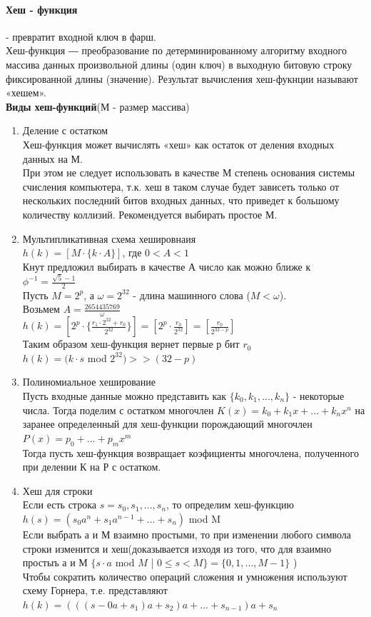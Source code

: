 \documentclass[a4paper,10pt]{article}
\begin{document}
\paragraph{Хеш - функция} - превратит входной ключ в фарш.\\
Хеш-функция ― преобразование по детерминированному алгоритму входного массива данных произвольной длины (один ключ) в выходную битовую строку фиксированной длины (значение). Результат вычисления хеш-фукнции называют «хешем».\\
\textbf{Виды хеш-функций}(М - размер массива)
\begin{enumerate}
	\item Деление с остатком\\
Хеш-функция может вычислять «хеш» как остаток от деления входных данных на М.\\
При этом не следует использовать в качестве М степень основания системы счисления компьютера, т.к. хеш в таком случае будет зависеть только от нескольких последний битов входных данных, что приведет к большому количеству коллизий. Рекомендуется выбирать простое М.
	\item Мультипликативная схема хешировнаия\\
$h(k) = [M \cdot \{ k \cdot A \} ] $, где $0 < A < 1$\\
Кнут предложил выбирать в качестве А число как можно ближе к $\phi^{-1} = \frac{\sqrt{5} - 1}{2}$\\
Пусть $M = 2^{p}$, а $\omega = 2^{32}$ - длина машинного слова ($M < \omega$).\\
Возьмем $A = \frac{2654435769}{\omega}$\\ 
$h(k) = [2^{p} \cdot \{\frac{r_1 \cdot 2^{32} + r_0}{2^{32}}\}] = [2^p\cdot \frac{r_0}{2^{32}}] = [\frac{r_0}{2^{32-p}}]$\\
Таким образом хеш-функция вернет первые р бит $r_0$\\
$h(k) = (k\cdot s$ mod $2^{32}) >> (32 - p)$
	\item Полиномиальное хеширование\\
Пусть входные данные можно представить как $\{k_0, k_1, ..., k_n \}$ - некоторые числа. Тогда поделим с остатком многочлен $K(x) = k_0 + k_1x + ... + k_n x^n$ на заранее определенный для хеш-функции порождающий многочлен $P(x) = p_0 + ... + p_m x^m$\\
Тогда пусть хеш-функция возвращает коэфициенты многочлена, полученного при делении К на Р с остатком.
	\item Хеш для строки\\
Если есть строка $s = s_0, s_1, ..., s_n$, то определим хеш-функцию $h(s) = (s_0a^n + s_1a^{n-1} + ... + s_n)$ mod M\\
Если выбрать а и М взаимно простыми, то при изменении любого символа строки изменится и хеш(доказывается изходя из того, что для взаимно простыъ а и М $\{s\cdot a$ mod $M$ | $ 0\leq s < M\}=\{0, 1, ..., M-1\}$ )\\
Чтобы сократить количество операций сложения и умножения используют схему Горнера, т.е. представляют $h(k) = (((s-0a + s_1)a+s_2)a+ ... + s_{n-1})a+s_n$
\end{enumerate}
\end{document}
